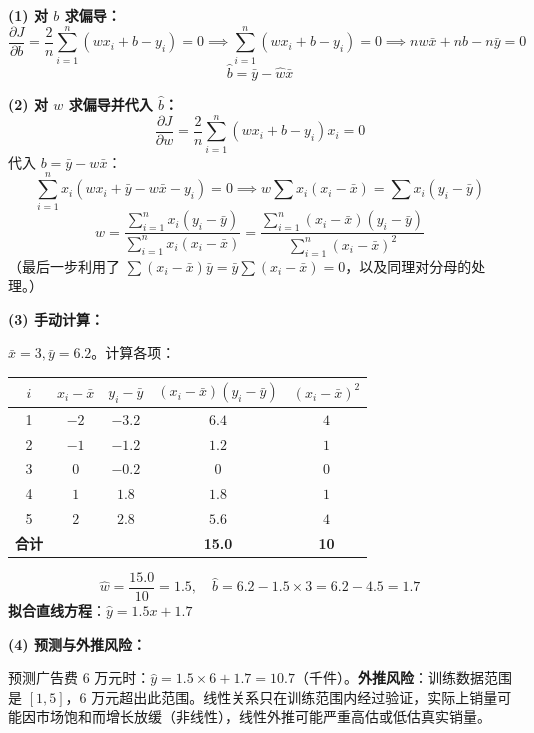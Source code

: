 \documentclass[a4paper,11pt]{ctexart}
\begin{document}
\begin{solutionbox}[参考答案与详细解析]
    \textbf{(1) 对 $b$ 求偏导：}
    \[
    \frac{\partial J}{\partial b} = \frac{2}{n}\sum_{i=1}^n(wx_i+b-y_i) = 0
    \implies \sum_{i=1}^n(wx_i+b-y_i)=0
    \implies nw\bar{x}+nb-n\bar{y}=0
    \]
    \[
    \boxed{\hat{b} = \bar{y} - \hat{w}\bar{x}}
    \]

    \textbf{(2) 对 $w$ 求偏导并代入 $\hat{b}$：}
    \[
    \frac{\partial J}{\partial w} = \frac{2}{n}\sum_{i=1}^n(wx_i+b-y_i)x_i = 0
    \]
    代入 $b = \bar{y} - w\bar{x}$：
    \[
    \sum_{i=1}^n x_i(wx_i + \bar{y} - w\bar{x} - y_i) = 0
    \implies w\sum x_i(x_i-\bar{x}) = \sum x_i(y_i-\bar{y})
    \]
    \[
    \boxed{\hat{w} = \frac{\sum_{i=1}^n x_i(y_i-\bar{y})}{\sum_{i=1}^n x_i(x_i-\bar{x})} = \frac{\sum_{i=1}^n(x_i-\bar{x})(y_i-\bar{y})}{\sum_{i=1}^n(x_i-\bar{x})^2}}
    \]
    （最后一步利用了 $\sum(x_i-\bar{x})\bar{y}=\bar{y}\sum(x_i-\bar{x})=0$，以及同理对分母的处理。）

    \textbf{(3) 手动计算：}

    $\bar{x}=3, \bar{y}=6.2$。计算各项：

    \begin{center}
    \begin{tabular}{ccccc}
        \toprule
        $i$ & $x_i-\bar{x}$ & $y_i-\bar{y}$ & $(x_i-\bar{x})(y_i-\bar{y})$ & $(x_i-\bar{x})^2$ \\
        \midrule
        1 & $-2$ & $-3.2$ & $6.4$ & $4$ \\
        2 & $-1$ & $-1.2$ & $1.2$ & $1$ \\
        3 & $0$  & $-0.2$ & $0$   & $0$ \\
        4 & $1$  & $1.8$  & $1.8$ & $1$ \\
        5 & $2$  & $2.8$  & $5.6$ & $4$ \\
        \midrule
        \textbf{合计} & & & \textbf{15.0} & \textbf{10} \\
        \bottomrule
    \end{tabular}
    \end{center}

    \[
    \hat{w} = \frac{15.0}{10} = 1.5, \quad \hat{b} = 6.2 - 1.5\times3 = 6.2 - 4.5 = 1.7
    \]
    \textbf{拟合直线方程}：$\hat{y} = 1.5x + 1.7$

    \textbf{(4) 预测与外推风险：}

    预测广告费 6 万元时：$\hat{y} = 1.5\times6 + 1.7 = 10.7$（千件）。\textbf{外推风险}：训练数据范围是 $[1,5]$，6 万元超出此范围。线性关系只在训练范围内经过验证，实际上销量可能因市场饱和而增长放缓（非线性），线性外推可能严重高估或低估真实销量。
\end{solutionbox}
\end{document}
